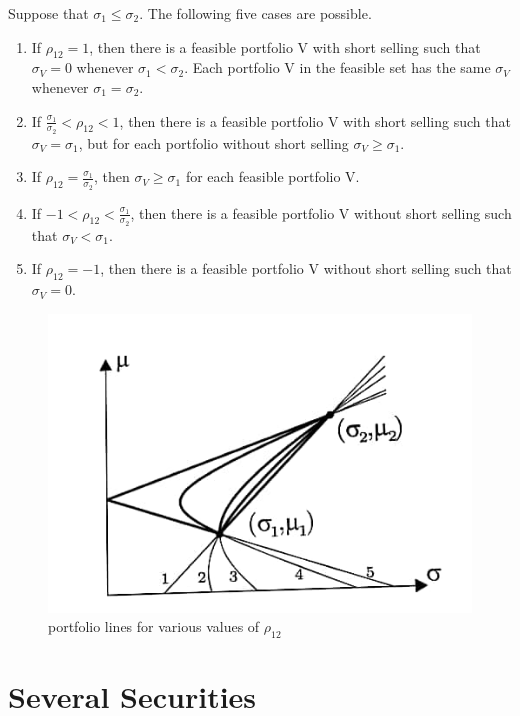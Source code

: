 \begin{theorem}
    Suppose that $\sigma_{1} \leq \sigma_{2}$. The following five cases are possible.
    \begin{enumerate}
        \item If $\rho_{12}=1$, then there is a feasible portfolio V with short selling such that $\sigma_{V}=0$ whenever $\sigma_{1}<\sigma_{2}$. Each portfolio V in the feasible set has the same $\sigma_{V}$ whenever $\sigma_{1}=\sigma_{2}$.
        \item If $\frac{\sigma_{1}}{\sigma_{2}}<\rho_{12}<1$, then there is a feasible portfolio V with short selling such that $\sigma_{V}=\sigma_{1}$, but for each portfolio without short selling $\sigma_{V} \geq \sigma_{1}$.
        \item If $\rho_{12}=\frac{\sigma_{1}}{\sigma_{2}}$, then $\sigma_{V} \geq \sigma_{1}$ for each feasible portfolio V.
        \item If $-1<\rho_{12}<\frac{\sigma_{1}}{\sigma_{2}}$, then there is a feasible portfolio V without short selling such that $\sigma_{V}<\sigma_{1}$.
        \item If $\rho_{12}=-1$, then there is a feasible portfolio V without short selling such that $\sigma_{V}=0$.
    \end{enumerate}
\end{theorem}
\begin{figure}[htp]
    \centering
    \includegraphics[width=12cm]{6.jpg}
    \caption{portfolio lines for various values of $\rho_{12}$}
    \label{fig:SI}
\end{figure}
\section{Several Securities}

